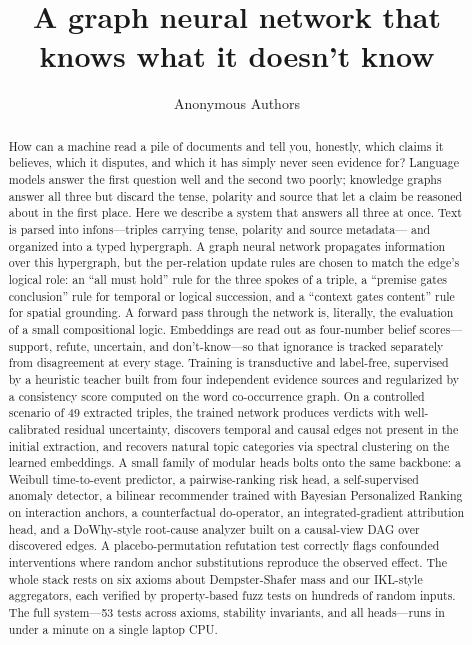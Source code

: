 \documentclass[11pt,a4paper]{article}
\title{A graph neural network that knows what it doesn't know}
\author{Anonymous Authors}
\affil{}
\date{}
\begin{document}
\maketitle

\begin{abstract}
How can a machine read a pile of documents and tell you, honestly,
which claims it believes, which it disputes, and which it has
simply never seen evidence for? Language models answer the first
question well and the second two poorly; knowledge graphs answer
all three but discard the tense, polarity and source that let a
claim be reasoned about in the first place. Here we describe a
system that answers all three at once. Text is parsed into
infons---triples carrying tense, polarity and source metadata---
and organized into a typed hypergraph. A graph neural network
propagates information over this hypergraph, but the per-relation
update rules are chosen to match the edge's logical role: an
``all must hold'' rule for the three spokes of a triple, a
``premise gates conclusion'' rule for temporal or logical
succession, and a ``context gates content'' rule for spatial
grounding. A forward pass through the network is, literally, the
evaluation of a small compositional logic. Embeddings are read
out as four-number belief scores---support, refute, uncertain,
and don't-know---so that ignorance is tracked separately from
disagreement at every stage. Training is transductive and
label-free, supervised by a heuristic teacher built from four
independent evidence sources and regularized by a consistency
score computed on the word co-occurrence graph. On a controlled
scenario of 49 extracted triples, the trained network produces
verdicts with well-calibrated residual uncertainty, discovers
temporal and causal edges not present in the initial extraction,
and recovers natural topic categories via spectral clustering on
the learned embeddings. A small family of modular heads bolts
onto the same backbone: a Weibull time-to-event predictor, a
pairwise-ranking risk head, a self-supervised anomaly detector,
a bilinear recommender trained with Bayesian Personalized
Ranking on interaction anchors, a counterfactual do-operator, an
integrated-gradient attribution head, and a DoWhy-style
root-cause analyzer built on a causal-view DAG over discovered
edges. A placebo-permutation refutation test correctly flags
confounded interventions where random anchor substitutions
reproduce the observed effect. The whole stack rests on six
axioms about Dempster-Shafer mass and our IKL-style aggregators,
each verified by property-based fuzz tests on hundreds of random
inputs. The full system---53 tests across axioms, stability
invariants, and all heads---runs in under a minute on a single
laptop CPU.
\end{abstract}
\end{document}
